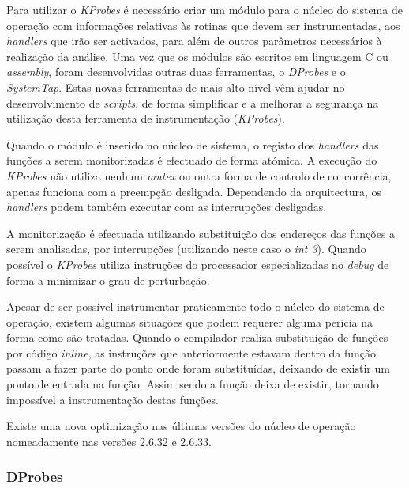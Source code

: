 Para utilizar o \textit{KProbes} é necessário criar um módulo para o núcleo do sistema de operação com informações relativas às rotinas que devem ser instrumentadas, aos \textit{handlers} que irão ser activados, para além de outros parâmetros necessários à realização da análise.
Uma vez que os módulos são escritos em linguagem C ou \textit{assembly}, foram desenvolvidas outras duas ferramentas, o \textit{DProbes} e o \textit{SystemTap}.
Estas novas ferramentas de mais alto nível vêm ajudar no desenvolvimento de \textit{scripts}, de forma simplificar e a melhorar a segurança na utilização desta ferramenta de instrumentação (\textit{KProbes}).

Quando o módulo é inserido no núcleo de sistema, o registo dos \textit{handlers} das funções a serem monitorizadas é efectuado de forma atómica.
A execução do \textit{KProbes} não utiliza nenhum \textit{mutex} ou outra forma de controlo de concorrência, apenas funciona com a preempção desligada.
Dependendo da arquitectura, os \textit{handlers} podem também executar com as interrupções desligadas.

A monitorização é efectuada utilizando substituição dos endereços das funções a serem analisadas, por interrupções (utilizando neste caso o \textit{int 3}). Quando possível o \textit{KProbes} utiliza instruções do processador especializadas no \textit{debug} de forma a minimizar o grau de perturbação. 

Apesar de ser possível instrumentar praticamente todo o núcleo do sistema de operação, existem algumas situações que podem requerer alguma perícia na forma como são tratadas.
Quando o compilador realiza substituição de funções por código \textit{inline}, as instruções que anteriormente estavam dentro da função passam a fazer parte do ponto onde foram substituídas, deixando de existir um ponto de entrada na função.
Assim sendo a função deixa de existir, tornando impossível a instrumentação destas funções.

Existe uma nova optimização nas últimas versões do núcleo de operação nomeadamente nas versões 2.6.32 e 2.6.33.


\subsubsection{DProbes}\label{cap:Dprobe_overview}

